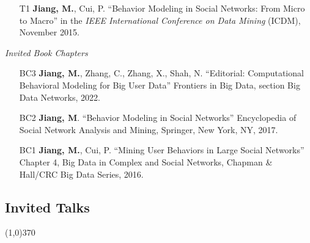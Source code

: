 \documentclass[10pt]{article}
\newenvironment{myindentpar}[1]%
{\begin{list}{}%
         {\setlength{\leftmargin}{#1}}%
         \item[]%
}
{\end{list}}
\newcounter{list}
\begin{document}
\begin{myindentpar}{0.00cm}
\begin{enumerate}[leftmargin=.5cm]
\item[T1] \textbf{Jiang, M.}, Cui, P. ``Behavior Modeling in Social Networks: From Micro to Macro'' in the \textit{IEEE International Conference on Data Mining} (ICDM), November 2015.

\end{enumerate}

\hspace{-0.25cm}\textit{Invited Book Chapters}

\begin{enumerate}[leftmargin=.5cm]

\item[BC3] \textbf{Jiang, M.}, Zhang, C., Zhang, X., Shah, N. ``Editorial: Computational Behavioral Modeling for Big User Data'' Frontiers in Big Data, section Big Data Networks, 2022.
		
\item[BC2] \textbf{Jiang, M}. ``Behavior Modeling in Social Networks'' Encyclopedia of Social Network Analysis and Mining, Springer, New York, NY, 2017.
		
\item[BC1] \textbf{Jiang, M.}, Cui, P. ``Mining User Behaviors in Large Social Networks'' Chapter 4, Big Data in Complex and Social Networks, Chapman \& Hall/CRC Big Data Series, 2016.

\end{enumerate}

\end{myindentpar}

\subsection{\sc Invited Talks}
\vspace{-0.4cm} \line(1,0){370} \vspace{-0.1cm}
\end{document}
